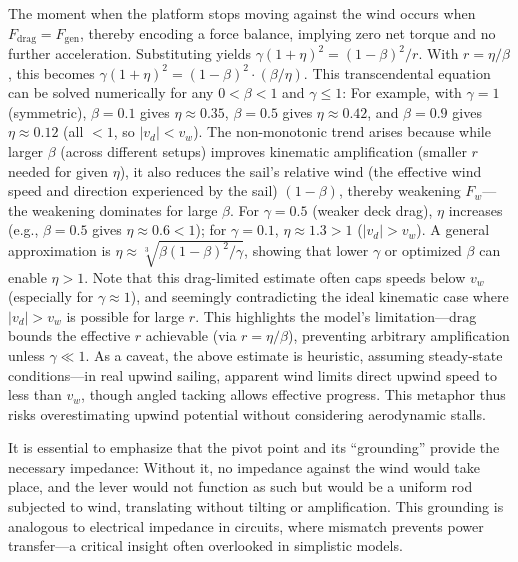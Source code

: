\documentclass[reprint,aps,pra,superscriptaddress,longbibliography]{revtex4-2}
\begin{document}
The moment when the platform stops moving against the wind occurs when $F_\text{drag} = F_\text{gen}$, thereby encoding a force balance, implying zero net torque and no further acceleration. Substituting yields $\gamma (1 + \eta)^2 = (1 - \beta)^2 / r$. With $r = \eta / \beta$, this becomes $\gamma (1 + \eta)^2 = (1 - \beta)^2 \cdot (\beta / \eta)$.
This transcendental equation can be solved numerically for any $0 < \beta < 1$ and $\gamma \leq 1$:
For example, with $\gamma=1$ (symmetric), $\beta=0.1$ gives $\eta \approx 0.35$, $\beta=0.5$
gives $\eta \approx 0.42$, and $\beta=0.9$ gives $\eta \approx 0.12$ (all $<1$, so $|v_d| < v_w$).
The non-monotonic trend arises because while larger $\beta$ (across different setups) improves kinematic amplification
(smaller $r$ needed for given $\eta$), it also reduces the sail's relative wind
(the effective wind speed and direction experienced by the sail) $(1 - \beta)$,
thereby weakening $F_w$---the weakening dominates for large $\beta$. For $\gamma=0.5$ (weaker deck drag),
$\eta$ increases (e.g., $\beta=0.5$ gives $\eta \approx 0.6 <1$); for $\gamma=0.1$, $\eta \approx 1.3 >1$ ($|v_d| > v_w$).
A general approximation is $\eta \approx \sqrt[3]{\beta (1 - \beta)^2 / \gamma}$,
showing that lower $\gamma$ or optimized $\beta$ can enable $\eta >1$.
Note that this drag-limited estimate often caps speeds below $v_w$ (especially for $\gamma \approx 1$),
and seemingly contradicting the ideal kinematic case where $|v_d| > v_w$ is possible for large $r$.
This highlights the model's limitation---drag bounds the effective $r$ achievable (via $r = \eta / \beta$),
preventing arbitrary amplification unless $\gamma \ll 1$.
As a caveat, the above estimate is heuristic, assuming steady-state conditions---in real upwind sailing,
apparent wind limits direct upwind speed to less than $v_w$, though angled tacking allows effective progress.
This metaphor thus risks overestimating upwind potential without considering aerodynamic stalls.

It is essential to emphasize that the pivot point and its ``grounding'' provide the necessary impedance: Without it, no impedance against the wind would take place, and the lever would not function as such but would be a uniform rod subjected to wind, translating without tilting or amplification. This grounding is analogous to electrical impedance in circuits, where mismatch prevents power transfer---a critical insight often overlooked in simplistic models.
\end{document}
